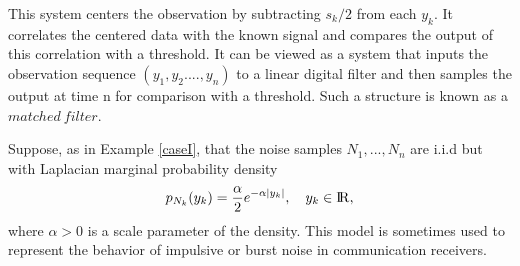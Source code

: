 \documentclass[a4paper,english,12pt]{article}
\begin{document}
\begin{exmp}
This system centers the observation by subtracting $s_{k}/2$ from each $y_{k}$. It correlates the centered data with the known signal and compares the output of this correlation with a threshold. It can be viewed as a system that inputs the observation sequence $(y_{1}, y_{2}....,y_{n})$ to a linear digital filter and then samples the output at time n for comparison with a threshold. Such a structure is known as a $matched\ filter$.
\end{exmp}

\begin{exmp}
Suppose, as in Example \ref{caseI}, 	that the noise samples $N_{1},...,N_{n}$ are i.i.d but with Laplacian marginal probability density
\begin{equation}
\label{density_Laplacian}
p_{N_{k}}(y_{k}) = \frac{\alpha}{2} e^{-\alpha |y_{k}|},\hspace{10pt}y_{k}\in {\rm I\!R} ,
\end{equation}
where $\alpha>0$ is a scale parameter of the density. This model is sometimes used to represent the behavior of impulsive or burst noise in communication receivers.


\end{exmp}
\end{document}
